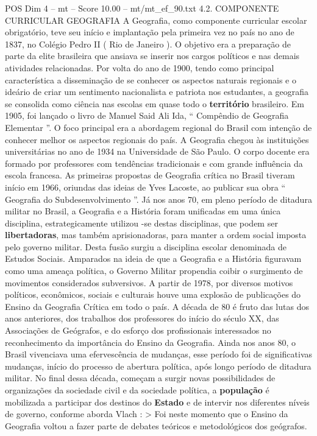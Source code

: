\begin{textsample}{POS Dim 4 – mt – Score 10.00 – mt/mt\_ef\_90.txt}  \label{ex:f4_pos_179}
4.2.
COMPONENTE CURRICULAR GEOGRAFIA A Geografia, como componente curricular escolar obrigatório, teve seu início e implantação pela primeira vez no país no ano de 1837, no Colégio Pedro II ( Rio de Janeiro ).
O objetivo era a preparação de parte da elite brasileira que ansiava se inserir nos cargos políticos e nas demais atividades relacionadas.
Por volta do ano de 1900, tendo como principal característica a disseminação de se conhecer os aspectos naturais regionais e o ideário de criar um sentimento nacionalista e patriota nos estudantes, a geografia se consolida como ciência nas escolas em quase todo o \textbf{território} brasileiro.
Em 1905, foi lançado o livro de Manuel Said Ali Ida, “ Compêndio de Geografia Elementar ”.
O foco principal era a abordagem regional do Brasil com intenção de conhecer melhor os aspectos regionais do país.
A Geografia chegou às instituições universitárias no ano de 1934 na Universidade de São Paulo.
O corpo docente era formado por professores com tendências tradicionais e com grande influência da escola francesa.
As primeiras propostas de Geografia crítica no Brasil tiveram início em 1966, oriundas das ideias de Yves Lacoste, ao publicar sua obra “ Geografia do Subdesenvolvimento ”.
Já nos anos 70, em pleno período de ditadura militar no Brasil, a Geografia e a História foram unificadas em uma única disciplina, estrategicamente utilizou -se destas disciplinas, que podem ser \textbf{libertadoras}, mas também aprisionadoras, para manter a ordem social imposta pelo governo militar.
Desta fusão surgiu a disciplina escolar denominada de Estudos Sociais.
Amparados na ideia de que a Geografia e a História figuravam como uma ameaça política, o Governo Militar propendia coibir o surgimento de movimentos considerados subversivos.
A partir de 1978, por diversos motivos políticos, econômicos, sociais e culturais houve uma explosão de publicações do Ensino da Geografia Crítica em todo o país.
A década de 80 é fruto das lutas dos anos anteriores, dos trabalhos dos professores do início do século XX, das Associações de Geógrafos, e do esforço dos profissionais interessados no reconhecimento da importância do Ensino da Geografia.
Ainda nos anos 80, o Brasil vivenciava uma efervescência de mudanças, esse período foi de significativas mudanças, início do processo de abertura política, após longo período de ditadura militar.
No final dessa década, começam a surgir novas possibilidades de organizações da sociedade civil e da sociedade política, a \textbf{população} é mobilizada a participar dos destinos do \textbf{Estado} e de intervir nos diferentes níveis de governo, conforme aborda Vlach : > Foi neste momento que o Ensino da Geografia voltou a fazer parte de debates teóricos e metodológicos dos geógrafos.

\end{textsample}
